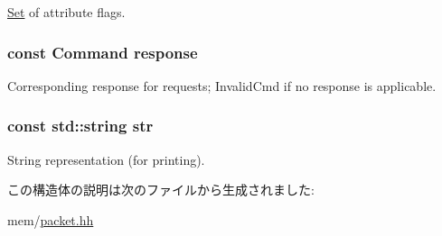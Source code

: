 \hyperlink{classSet}{Set} of attribute flags. \hypertarget{structMemCmd_1_1CommandInfo_a1c57b679ee250b3cfb3763a8c68a41d2}{
\subsubsection[{response}]{\setlength{\rightskip}{0pt plus 5cm}const {\bf Command} {\bf response}}}
\label{structMemCmd_1_1CommandInfo_a1c57b679ee250b3cfb3763a8c68a41d2}
Corresponding response for requests; InvalidCmd if no response is applicable. \hypertarget{structMemCmd_1_1CommandInfo_a2a98c1fe01d4f15bb6333773fbbe879c}{
\subsubsection[{str}]{\setlength{\rightskip}{0pt plus 5cm}const std::string {\bf str}}}
\label{structMemCmd_1_1CommandInfo_a2a98c1fe01d4f15bb6333773fbbe879c}


String representation (for printing). 

この構造体の説明は次のファイルから生成されました:\begin{DoxyCompactItemize}
\item 
mem/\hyperlink{packet_8hh}{packet.hh}\end{DoxyCompactItemize}

